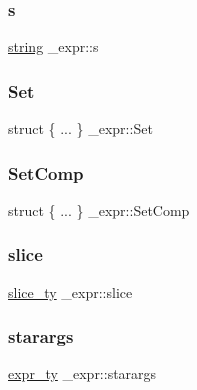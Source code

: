 \mbox{\label{struct__expr_af8e7cad86edb557f8db8e1f447e2a139}} 
\subsubsection{\texorpdfstring{s}{s}}
{\footnotesize\ttfamily \mbox{\hyperlink{asdl_8h_ae84541b4f3d8e1ea24ec0f466a8c568b}{string}} \+\_\+expr\+::s}

\mbox{\label{struct__expr_a223cc837e21a63769d029e75a361de68}} 
\subsubsection{\texorpdfstring{Set}{Set}}
{\footnotesize\ttfamily struct \{ ... \}   \+\_\+expr\+::\+Set}

\mbox{\label{struct__expr_abc7760775435e89107756fdcef9c14ca}} 
\subsubsection{\texorpdfstring{SetComp}{SetComp}}
{\footnotesize\ttfamily struct \{ ... \}   \+\_\+expr\+::\+Set\+Comp}

\mbox{\label{struct__expr_ad7a0880c385cf09022462c09018e9d71}} 
\subsubsection{\texorpdfstring{slice}{slice}}
{\footnotesize\ttfamily \mbox{\hyperlink{_python-ast_8h_a1aba5288236679e8faff34c189476bf0}{slice\+\_\+ty}} \+\_\+expr\+::slice}

\mbox{\label{struct__expr_ade11f9a516daf704b27148648b599663}} 
\subsubsection{\texorpdfstring{starargs}{starargs}}
{\footnotesize\ttfamily \mbox{\hyperlink{_python-ast_8h_a56d3705e020a071405094a220c4592bd}{expr\+\_\+ty}} \+\_\+expr\+::starargs}

